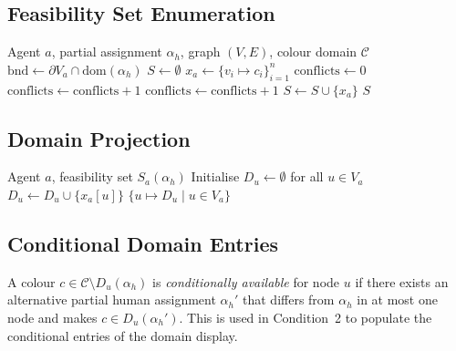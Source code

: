 \documentclass[10pt]{article}
\theoremstyle{definition}
\begin{document}
\subsection{Feasibility Set Enumeration}

\begin{algorithm}
\caption{ComputeFeasibilitySet: exact enumeration of $S_a(\alpha_h)$}
\label{alg:feasset}
\begin{algorithmic}[1]
\REQUIRE Agent $a$, partial assignment $\alpha_h$, graph $(V, E)$, colour domain $\mathcal{C}$
\STATE $\mathrm{bnd} \gets \partial V_a \cap \mathrm{dom}(\alpha_h)$
\STATE $S \gets \emptyset$
  \STATE $x_a \gets \{v_i \mapsto c_i\}_{i=1}^{n}$
  \STATE $\mathrm{conflicts} \gets 0$
      \STATE $\mathrm{conflicts} \gets \mathrm{conflicts} + 1$
    \ENDIF
      \STATE $\mathrm{conflicts} \gets \mathrm{conflicts} + 1$
    \ENDIF
  \ENDFOR
    \STATE $S \gets S \cup \{x_a\}$
  \ENDIF
\ENDFOR
\RETURN $S$
\end{algorithmic}
\end{algorithm}

\subsection{Domain Projection}

\begin{algorithm}
\caption{ComputeDomainProjection: $D_u(\alpha_h)$ for all agent nodes}
\label{alg:domain}
\begin{algorithmic}[1]
\REQUIRE Agent $a$, feasibility set $S_a(\alpha_h)$
\STATE Initialise $D_u \gets \emptyset$ for all $u \in V_a$
    \STATE $D_u \gets D_u \cup \{x_a[u]\}$
  \ENDFOR
\ENDFOR
\RETURN $\{u \mapsto D_u \mid u \in V_a\}$
\end{algorithmic}
\end{algorithm}

\subsection{Conditional Domain Entries}

A colour $c \in \mathcal{C} \setminus D_u(\alpha_h)$ is \emph{conditionally available} for node
$u$ if there exists an alternative partial human assignment $\alpha_h'$ that differs from
$\alpha_h$ in at most one node and makes $c \in D_u(\alpha_h')$.  This is used in
Condition~2 to populate the conditional entries of the domain display.
\end{document}
